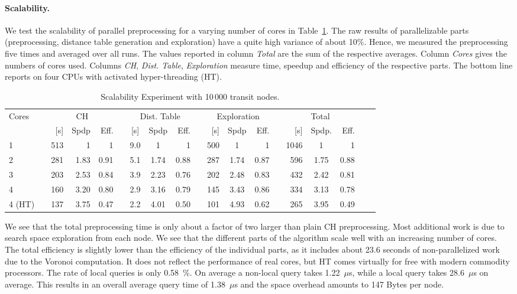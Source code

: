 \documentclass{llncs}
\begin{document}
\paragraph{Scalability.}
We test the scalability of parallel preprocessing for a varying number of cores in
Table~\ref{tab:MultiThreadPreprocessing}. 
The raw results of parallelizable parts (preprocessing, distance table generation and exploration) have a quite high variance of about 10\%. 
Hence, we measured the preprocessing five times and averaged over all runs. 
The values reported in column \emph{Total} are the sum of the respective averages.
Column \emph{Cores} gives the numbers of cores used.
Columns \emph{CH}, \emph{Dist. Table}, \emph{Exploration} measure time, speedup and efficiency of the respective parts.
The bottom line reports on four CPUs with activated hyper-threading (HT).

\begin{table}[t]
\caption{Scalability Experiment with 10\,000 transit nodes.}
\label{tab:MultiThreadPreprocessing}
\centering
\begin{tabular}{lcrrrcccrrrcrrrcrrr}
\toprule
Cores & & \multicolumn{3}{c}{CH} & & \multicolumn{3}{c}{Dist. Table} & & \multicolumn{3}{c}{Exploration} &  & \multicolumn{3}{c}{Total} \\[0.5em]\cline{1-1}\cline{3-5}\cline{7-9}\cline{11-13}\cline{15-17}
& & [s] & Spdp & Eff. & & [s] &  Spdp & Eff. & & [s] & Spdp & Eff. & & [s] & Spdp. & Eff. \\
\midrule
1 & & 513 & 1 & 1 & & 9.0 & 1 & 1 &  & 500 & 1 & 1 & & 1046 & 1 & 1\\
2 & & 281 & 1.83 & 0.91 & & 5.1 & 1.74 & 0.88 & & 287 & 1.74 & 0.87 &  & 596 & 1.75 & 0.88 \\
3 & & 203 & 2.53 & 0.84 & & 3.9 & 2.23 & 0.76 & & 202 & 2.48 & 0.83 & & 432 & 2.42 & 0.81 \\
4 & & 160 & 3.20 & 0.80 & & 2.9 & 3.16 & 0.79 & & 145 & 3.43 & 0.86 & & 334 & 3.13 & 0.78 \\
\midrule
4 (HT) & & 137 & 3.75 & 0.47 & & 2.2 & 4.01 & 0.50 & & 101 & 4.93 & 0.62 & & 265 & 3.95 & 0.49 \\
\bottomrule 
\end{tabular}
\end{table}
We see that the total preprocessing time is only about a factor of two larger than plain CH preprocessing. Most additional work is due to search space exploration from each node.
We see that the different parts of the algorithm scale well with an increasing number of cores.
The total efficiency is slightly lower than the efficiency of the individual parts, as it includes about 23.6 seconds of non-parallelized work due to the Voronoi computation.
It does not reflect the performance of real cores, but HT comes virtually for free with modern commodity processors.
The rate of local queries is only 0.58~\%.
On average a non-local query takes 1.22~$\mu$s, while a local query takes 28.6~$\mu$s on average.
This results in an overall average query time of 1.38~$\mu$s and the space overhead amounts to 147 Bytes per node.
\end{document}
